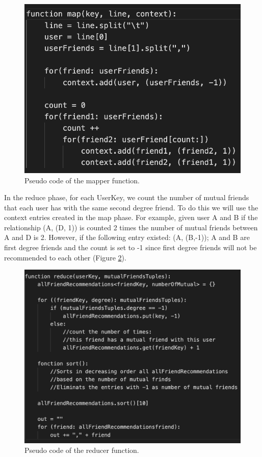 \documentclass[12pt]{article}
\begin{document}
\begin{figure}[h]
  \includegraphics[scale=0.65]{img/map.png}
  \caption{Pseudo code of the mapper function.}
  \label{fig:map}
\end{figure}

In the reduce phase, for each UserKey, we count the number of mutual friends that each user has with the same second degree friend. To do this we will use the context entries created in the map phase. For example, given user A and B if the relationship (A, (D, 1)) is counted 2 times the number of mutual friends between A and D is 2. However, if the following entry existed: (A, (B,-1)); A and B are first degree friends and the count is set to -1 since first degree friends will not be recommended to each other (Figure \ref{fig:reduce}).

\begin{figure}[h]
  \includegraphics[scale=0.65]{img/reduce.png}
  \caption{Pseudo code of the reducer function.}
  \label{fig:reduce}
\end{figure}
\end{document}
